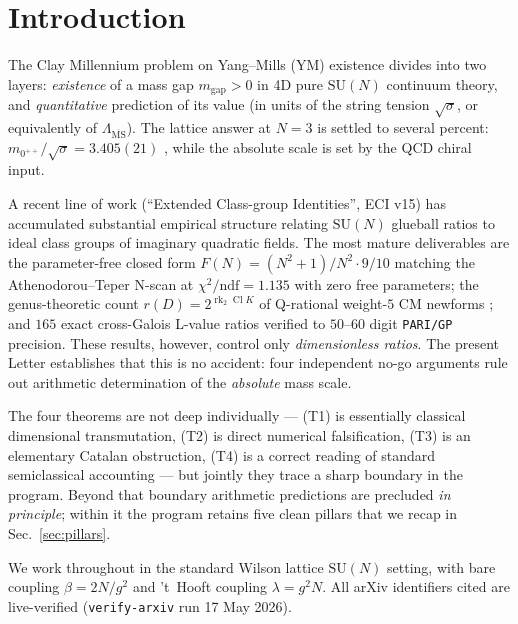 \documentclass[aps,prl,reprint,superscriptaddress,floatfix,nofootinbib,amssymb]{revtex4-2}
\theoremstyle{definition}
\theoremstyle{remark}
\DeclareMathOperator{\Cl}{Cl}
\DeclareMathOperator{\rk}{rk}
\newcommand{\msb}{\overline{\mathrm{MS}}}
\begin{document}
\maketitle

\section{Introduction}\label{sec:intro}
The Clay Millennium problem on Yang--Mills (YM) existence
\cite{JaffeWitten2000} divides into two layers: \emph{existence} of a
mass gap $m_{\text{gap}}>0$ in 4D pure $\mathrm{SU}(N)$ continuum
theory, and \emph{quantitative} prediction of its value (in units of
the string tension $\sqrt{\sigma}$, or equivalently of
$\Lambda_{\msb}$). The lattice answer at $N=3$ is settled to several
percent: $m_{0^{++}}/\sqrt{\sigma} = 3.405(21)$
\cite{AthenodorouTeper2021}, while the absolute scale is set by the
QCD chiral input.

A recent line of work \cite{ECI_v15_2026, RemondiereHSH2026}
(``Extended Class-group Identities'', ECI v15) has accumulated
substantial empirical structure relating $\mathrm{SU}(N)$ glueball
ratios to ideal class groups of imaginary quadratic fields. The most
mature deliverables are the parameter-free closed form
$F(N) = (N^2+1)/N^2 \cdot 9/10$
matching the Athenodorou--Teper N-scan at $\chi^2/\mathrm{ndf}=1.135$
with zero free parameters; the genus-theoretic count
$r(D) = 2^{\rk_2 \Cl K}$ of Q-rational weight-$5$ CM newforms
\cite{RemondiereHSH2026}; and $165$ exact cross-Galois L-value ratios
verified to $50$--$60$ digit \texttt{PARI/GP} precision. These
results, however, control only \emph{dimensionless ratios}. The
present Letter establishes that this is no accident: four independent
no-go arguments rule out arithmetic determination of the
\emph{absolute} mass scale.

The four theorems are not deep individually --- (T1) is essentially
classical dimensional transmutation, (T2) is direct numerical
falsification, (T3) is an elementary Catalan obstruction, (T4) is a
correct reading of standard semiclassical accounting --- but jointly
they trace a sharp boundary in the program. Beyond that boundary
arithmetic predictions are precluded \emph{in principle}; within it
the program retains five clean pillars that we recap in
Sec.~\ref{sec:pillars}.

We work throughout in the standard Wilson lattice $\mathrm{SU}(N)$
setting, with bare coupling $\beta = 2N/g^2$ and 't~Hooft coupling
$\lambda = g^2 N$. All arXiv identifiers cited are live-verified
(\texttt{verify-arxiv} run 17 May 2026).
\end{document}
